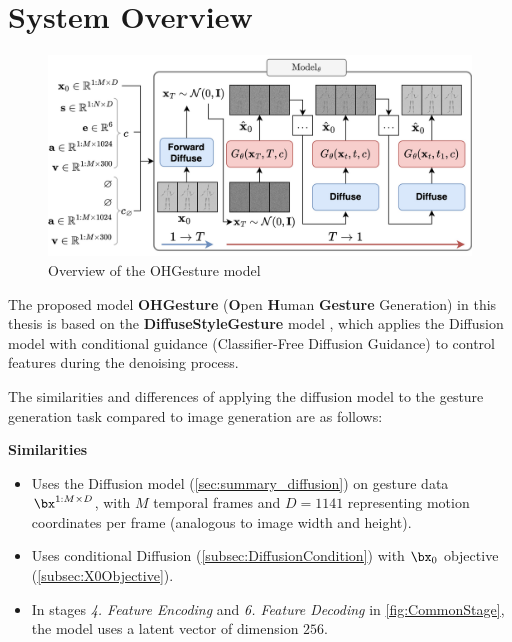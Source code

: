 \section{System Overview}
\label{sec:system_overview}



\begin{figure}[h]
	\centering
	\includegraphics[width=\linewidth]{images/AllStage}
	\caption{Overview of the OHGesture model}
	\label{fig:TrainingAndSampling}
\end{figure}

The proposed model \textbf{OHGesture} (\textbf{O}pen \textbf{H}uman \textbf{Gesture} Generation) in this thesis is based on the \textbf{DiffuseStyleGesture} model \cite{yang2023diffusestylegesture}, which applies the Diffusion model \cite{ho2020denoising} with conditional guidance \cite{ho2022classifier} (Classifier-Free Diffusion Guidance) to control features during the denoising process.

The similarities and differences of applying the diffusion model to the gesture generation task compared to image generation are as follows:

\vspace{10pt}

\textbf{Similarities}
\begin{itemize}
	\item Uses the Diffusion model (\autoref{sec:summary_diffusion}) on gesture data $\bx^{1:M \times D}$, with $M$ temporal frames and $D=1141$ representing motion coordinates per frame (analogous to image width and height).
	\item Uses conditional Diffusion (\autoref{subsec:DiffusionCondition}) with $\bx_0$ objective (\autoref{subsec:X0Objective}).
	\item In stages \textit{4. Feature Encoding} and \textit{6. Feature Decoding} in \autoref{fig:CommonStage}, the model uses a latent vector of dimension $256$.
\end{itemize}

